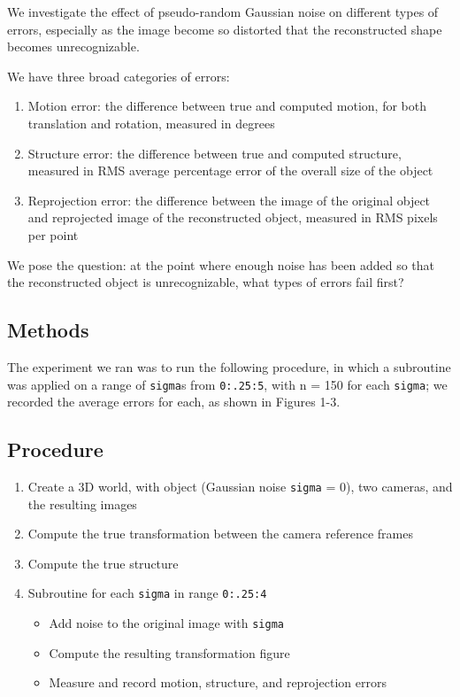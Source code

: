 \documentclass{article}
\begin{document}
We investigate the effect of pseudo-random Gaussian noise on different types of errors, especially as the image become so distorted that the reconstructed shape becomes unrecognizable.

We have three broad categories of errors:

\begin{enumerate}
  \item Motion error: the difference between true and computed motion, for both translation and rotation, measured in degrees
  \item Structure error: the difference between true and computed structure, measured in RMS average percentage error of the overall size of the object
  \item Reprojection error: the difference between the image of the original object and reprojected image of the reconstructed object, measured in RMS pixels per point
\end{enumerate} 

We pose the question: at the point where enough noise has been added so that the reconstructed object is unrecognizable, what types of errors fail first?




\subsection{Methods}

The experiment we ran was to run the following procedure, in which a subroutine was applied on a range of \texttt{sigma}s from \texttt{0:.25:5}, with n = 150 for each \texttt{sigma}; we recorded the average errors for each, as shown in Figures 1-3.

\subsection*{Procedure}

\begin{enumerate}
  \item Create a 3D world, with object (Gaussian noise \texttt{sigma} = 0), two cameras, and the resulting images
  \item Compute the true transformation between the camera reference frames
  \item Compute the true structure
  \item Subroutine for each \texttt{sigma} in range \texttt{0:.25:4}
  \begin{itemize}
  	\item Add noise to the original image with \texttt{sigma}
  	\item Compute the resulting transformation figure
  	\item Measure and record motion, structure, and reprojection errors
  \end{itemize}
\end{enumerate} 
\end{document}
